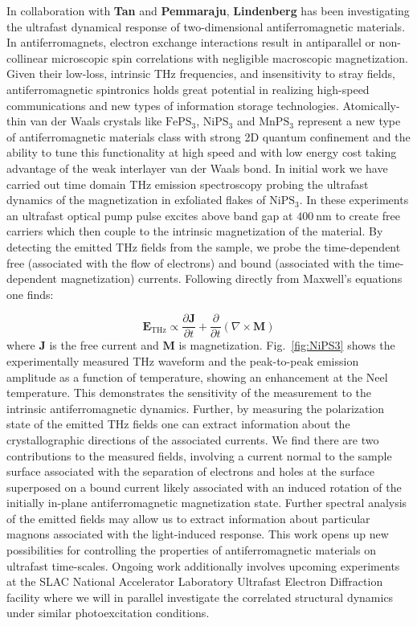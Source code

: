 In collaboration with {\bf Tan} and {\bf Pemmaraju}, {\bf Lindenberg} has been investigating the ultrafast dynamical response of two-dimensional antiferromagnetic materials.
In antiferromagnets, electron exchange interactions result in antiparallel or non-collinear microscopic spin correlations with negligible macroscopic magnetization.
Given their low-loss, intrinsic THz frequencies, and insensitivity to stray fields, antiferromagnetic spintronics holds great potential in realizing high-speed communications and new types of information storage technologies. 
Atomically-thin van der Waals crystals like \(\mathrm{FePS_3}\), \(\mathrm{NiPS_3}\) and \(\mathrm{MnPS_3}\) represent a new type of antiferromagnetic materials class with strong 2D quantum confinement and the ability to tune this functionality at high speed and with low energy cost taking advantage of the weak interlayer van der Waals bond.
In initial work we have carried out time domain THz emission spectroscopy probing the ultrafast dynamics of the magnetization in exfoliated flakes of \(\mathrm{NiPS_3}\).
In these experiments an ultrafast optical pump pulse excites above band gap at \(400~\mathrm{nm}\) to create free carriers which then couple to the intrinsic magnetization of the material.
By detecting the emitted THz fields from the sample, we probe the time-dependent free (associated with the flow of electrons) and bound (associated with the time-dependent magnetization) currents.
Following directly from Maxwell’s equations one finds: 

\begin{equation}
\mathbf{E}_\text{THz} \propto \frac{\partial\mathbf{J}}{\partial t} + \frac{\partial}{\partial t} (\nabla \times \mathbf{M})
\end{equation}
where \(\mathbf{J}\) is the free current and \(\mathbf{M}\) is magnetization. 
Fig.~\ref{fig:NiPS3} shows the experimentally measured THz waveform and the peak-to-peak emission amplitude as a function of temperature, showing an enhancement at the Neel temperature.
This demonstrates the sensitivity of the measurement to the intrinsic antiferromagnetic dynamics.
Further, by measuring the polarization state of the emitted THz fields one can extract information about the crystallographic directions of the associated currents.
We find there are two contributions to the measured fields, involving a current normal to the sample surface associated with the separation of electrons and holes at the surface superposed on a bound current likely associated with an induced rotation of the initially in-plane antiferromagnetic magnetization state.
Further spectral analysis of the emitted fields may allow us to extract information about particular magnons associated with the light-induced response.
This work opens up new possibilities for controlling the properties of antiferromagnetic materials on ultrafast time-scales. 
Ongoing work additionally involves upcoming experiments at the SLAC National Accelerator Laboratory Ultrafast Electron Diffraction facility where we will in parallel investigate the correlated structural dynamics under similar photoexcitation conditions.

